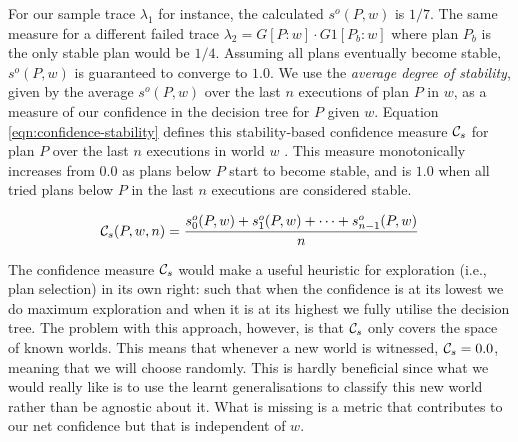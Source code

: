 For our sample trace $\lambda_1$ for instance, the calculated $s^o(P,w)$ is $1/7$. The same measure for a different failed trace $\lambda_2=G[P:w] \cdot G1[P_b:w]$ where plan $P_b$ is the only stable plan would be $1/4$. Assuming all plans eventually become stable, $s^o(P,w)$ is guaranteed to converge to $1.0$. We use the {\em average degree of stability}, given by the average $s^o(P,w)$ over the last $n$ executions of plan $P$ in $w$, as a measure of our confidence in the decision tree for $P$ given $w$. Equation \ref{eqn:confidence-stability} defines this stability-based confidence measure ${\mathcal{C}}_s$ for plan $P$ over the last $n$ executions in world $w$ . This measure monotonically increases from $0.0$ as plans below $P$ start to become stable, and is $1.0$ when all tried plans below $P$ in the last $n$ executions are considered stable. 

\begin{equation}
{\ensuremath{\mathcal{C}}}_s(P,w,n) = \frac{s^o_0(P,w) + s^o_1(P,w) + \cdots + s^o_{n-1}(P,w)}{n}
\label{eqn:confidence-stability}
\end{equation}



% 
% 
% 
% 
% 


The confidence measure ${\mathcal{C}}_s$ would make a useful heuristic for exploration (i.e., plan selection) in its own right: such that when the confidence is at its lowest we do maximum exploration and when it is at its highest we fully utilise the decision tree. The problem with this approach, however, is that ${\mathcal{C}}_s$ only covers the space of known worlds. This means that whenever a new world is witnessed, ${\mathcal{C}}_s=0.0$, meaning that we will choose randomly. This is hardly beneficial since what we would really like is to use the learnt generalisations to classify this new world rather than be agnostic about it. What is missing is a metric that contributes to our net confidence but that is independent of $w$.

